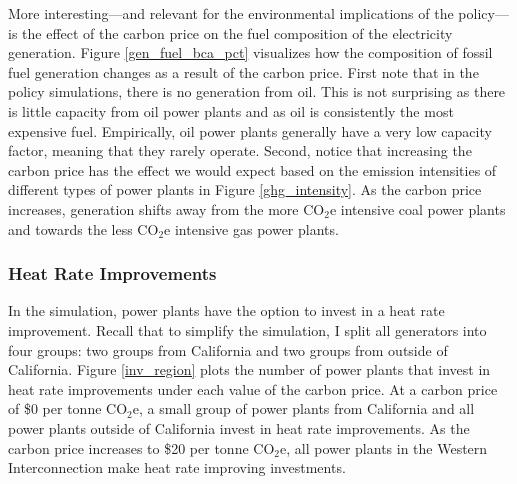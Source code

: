 More interesting---and relevant for the environmental implications of the policy---is the effect of the carbon price on the fuel composition of the electricity generation. Figure \ref{gen_fuel_bca_pct} visualizes how the composition of fossil fuel generation changes as a result of the carbon price. First note that in the policy simulations, there is no generation from oil. This is not surprising as there is little capacity from oil power plants and as oil is consistently the most expensive fuel. Empirically, oil power plants generally have a very low capacity factor, meaning that they rarely operate. Second, notice that increasing the carbon price has the effect we would expect based on the emission intensities of different types of power plants in Figure \ref{ghg_intensity}. As the carbon price increases, generation shifts away from the more CO$_2$e intensive coal power plants and towards the less CO$_2$e intensive gas power plants. 




\subsubsection*{Heat Rate Improvements}

In the simulation, power plants have the option to invest in a heat rate improvement. Recall that to simplify the simulation, I split all generators into four groups: two groups from California and two groups from outside of California. Figure \ref{inv_region} plots the number of power plants that invest in heat rate improvements under each value of the carbon price. At a carbon price of \$0 per tonne CO$_2$e, a small group of power plants from California and all power plants outside of California invest in heat rate improvements. As the carbon price increases to \$20 per tonne CO$_2$e, all power plants in the Western Interconnection make heat rate improving investments. 

